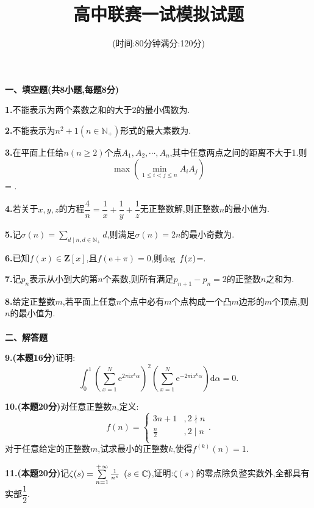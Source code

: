 \documentclass[UTF8]{ctexart}
\title{\vspace*{-5.5em}高中联赛一试模拟试题\vspace{-0.6em}}
\author{(时间:80分钟\quad 满分:120分)}
\date{\vspace*{-2em}}
\begin{document}
\maketitle
\hspace*{-2em}\textbf{一、填空题(共8小题,每题8分)}
\par\textbf{1.}不能表示为两个素数之和的大于2的最小偶数为\underline{\hspace{8em}}.\\
\par\textbf{2.}不能表示为$ n^2+1(n \in \mathbb{N_+}) $形式的最大素数为\underline{\hspace{8em}}.\\
\par\textbf{3.}在平面上任给$ n(n\ge 2) $个点$ A_1,A_2,\cdots ,A_n $,其中任意两点之间的距离不大于1.则\[\max{\left(\min\limits_{1\le i<j\le n} A_iA_j\right)}\]= \underline{\hspace{8em}}.\\
\par\textbf{4.}若关于$x,y,z$的方程$\dfrac{4}{n}=\dfrac{1}{x}+\dfrac{1}{y}+\dfrac{1}{z}$无正整数解,则正整数$n$的最小值为\underline{\hspace{8em}}.\\
\par\textbf{5.}记$\displaystyle \sigma(n)=\sum\limits_{d\mid n,d\in \mathbb{N_+}}d$,则满足$\sigma(n)=2n$的最小奇数为\underline{\hspace{8em}}.\\
\par\textbf{6.}已知$f(x)\in\mathbf{Z}[x]$,且$f(\mathrm{e}+\pi)=0$,则$ \mathrm{deg}\hspace{0.5em}f(x) $=\underline{\hspace{8em}}.\\
\par\textbf{7.}记$p_n$表示从小到大的第$n$个素数,则所有满足$p_{n+1}-p_n=2$的正整数$n$之和为\underline{\hspace{8em}}.\\
\par\textbf{8.}给定正整数$m$,若平面上任意$n$个点中必有$m$个点构成一个凸$m$边形的$m$个顶点,则$n$的最小值为\underline{\hspace{8em}}.\\
\\\textbf{二、解答题}
\par\textbf{9.(本题16分)}证明:
\[\int_0^1 \left( \sum\limits_{x=1}^{N}\mathrm{e}^{2\pi \mathrm{i}x^k\alpha}\right)^2 \left(\sum\limits_{x=1}^{N}\mathrm{e}^{-2\pi \mathrm{i}x^k\alpha} \right) \mathrm{d}\alpha =0.\]
\par\textbf{10.(本题20分)}对任意正整数$n$,定义:
\[f(n)=\left\{
\begin{matrix}
3n+1&,2\nmid n\\
\frac{n}{2}&,2\mid n\\
\end{matrix}
\right. .\]
对于任意给定的正整数$m$,试求最小的正整数$k$,使得$f^{(k)}(n)=1$.
\par\textbf{11.(本题20分)}记$\zeta(s)=\sum\limits_{n=1}^{+\infty}\frac{1}{n^s}\hspace{0.5em}(s\in\mathbb{C})$,证明:$\zeta(s)$的零点除负整实数外,全都具有实部$\dfrac{1}{2}$.
\end{document}
